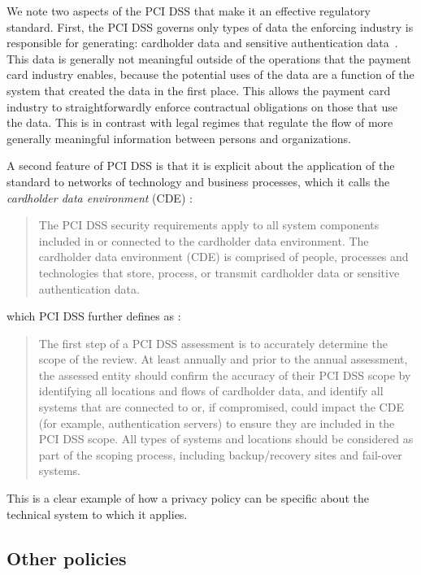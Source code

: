 \documentclass[../thesis.tex]{subfiles}
\begin{document}
We note two aspects of the PCI DSS that make it an effective 
regulatory standard.
First, the PCI DSS governs only types of data the enforcing 
industry is responsible for generating: cardholder data and 
sensitive authentication data~\cite{pcisecuritystandardscouncil2016DSS}.
This data is generally not meaningful outside of the operations 
that the payment card industry enables, because the potential 
uses of the data are a function of the system that created 
the data in the first place.
This allows the payment card industry to 
straightforwardly enforce contractual obligations on those 
that use the data.
This is in contrast with legal regimes that regulate the 
flow of more generally meaningful information between persons 
and organizations.

A second feature of PCI DSS is that it is explicit about 
the application of the standard to networks of technology and 
business processes,
which it calls the \textit{cardholder data environment} 
(CDE) \cite{pcisecuritystandardscouncil2016DSS}:
\begin{quote}
  The PCI DSS security requirements apply to all system components 
included in or connected to the cardholder data environment.
  The cardholder data environment (CDE) is comprised of people, 
processes and technologies that store, process, or transmit 
cardholder data or sensitive authentication data.
\end{quote}
which PCI DSS further defines as 
\cite{pcisecuritystandardscouncil2016DSS}:
\begin{quote}
  The first step of a PCI DSS assessment is to accurately 
determine the scope of the review.
  At least annually and prior to the annual assessment, 
the assessed entity should confirm the accuracy of their 
PCI DSS scope by identifying all locations and flows of 
cardholder data, and identify all systems that are connected 
to or, if compromised, could impact the CDE (for example, 
authentication servers) to ensure they are included in the
  PCI DSS scope.
  All types of systems and locations should be considered as 
part of the scoping process, including backup/recovery sites 
and fail-over systems.
\end{quote}

This is a clear example of how a privacy policy can be specific
about the technical system to which it applies.

\subsection{Other policies}
\end{document}
